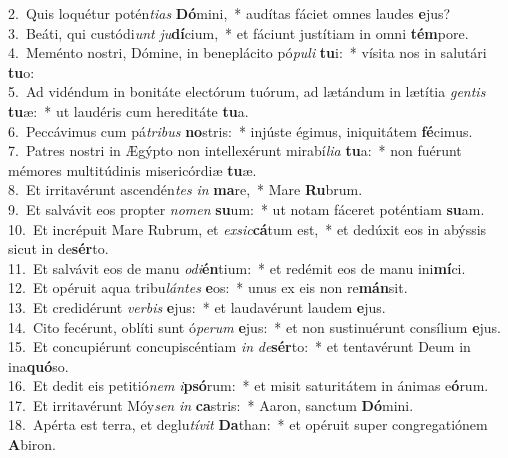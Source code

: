 {2.~}Quis loquétur potén\textit{ti}\textit{as} \textbf{Dó}mini,~* audítas fáciet omnes laudes \textbf{e}jus?\\
{3.~}Beáti, qui custódi\textit{unt} \textit{ju}\textbf{dí}cium,~* et fáciunt justítiam in omni \textbf{tém}pore.\\
{4.~}Meménto nostri, Dómine, in beneplácito pó\textit{pu}\textit{li} \textbf{tu}i:~* vísita nos in salutári \textbf{tu}o:\\
{5.~}Ad vidéndum in bonitáte electórum tuórum, ad lætándum in lætítia \textit{gen}\textit{tis} \textbf{tu}æ:~* ut laudéris cum hereditáte \textbf{tu}a.\\
{6.~}Peccávimus cum pá\textit{tri}\textit{bus} \textbf{no}stris:~* injúste égimus, iniquitátem \textbf{fé}cimus.\\
{7.~}Patres nostri in Ægýpto non intellexérunt mirabí\textit{li}\textit{a} \textbf{tu}a:~* non fuérunt mémores multitúdinis misericórdiæ \textbf{tu}æ.\\
{8.~}Et irritavérunt ascendén\textit{tes} \textit{in} \textbf{ma}re,~* Mare \textbf{Ru}brum.\\
{9.~}Et salvávit eos propter \textit{no}\textit{men} \textbf{su}um:~* ut notam fáceret poténtiam \textbf{su}am.\\
{10.~}Et incrépuit Mare Rubrum, et \textit{ex}\textit{sic}\textbf{cá}tum est,~* et dedúxit eos in abýssis sicut in de\textbf{sér}to.\\
{11.~}Et salvávit eos de manu \textit{o}\textit{di}\textbf{én}tium:~* et redémit eos de manu ini\textbf{mí}ci.\\
{12.~}Et opéruit aqua tribu\textit{lán}\textit{tes} \textbf{e}os:~* unus ex eis non re\textbf{mán}sit.\\
{13.~}Et credidérunt \textit{ver}\textit{bis} \textbf{e}jus:~* et laudavérunt laudem \textbf{e}jus.\\
{14.~}Cito fecérunt, oblíti sunt ó\textit{pe}\textit{rum} \textbf{e}jus:~* et non sustinuérunt consílium \textbf{e}jus.\\
{15.~}Et concupiérunt concupiscéntiam \textit{in} \textit{de}\textbf{sér}to:~* et tentavérunt Deum in ina\textbf{quó}so.\\
{16.~}Et dedit eis petitió\textit{nem} \textit{i}\textbf{psó}rum:~* et misit saturitátem in ánimas e\textbf{ó}rum.\\
{17.~}Et irritavérunt Móy\textit{sen} \textit{in} \textbf{ca}stris:~* Aaron, sanctum \textbf{Dó}mini.\\
{18.~}Apérta est terra, et deglu\textit{tí}\textit{vit} \textbf{Da}than:~* et opéruit super congregatiónem \textbf{A}biron.\\
